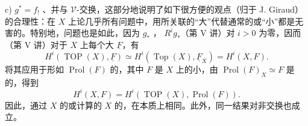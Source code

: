  c)  $g^*=f_!$ 、并与 $\mathcal V$-交换，这部分地说明了如下很方便的观点（归于 J. Giraud）的合理性：在 $X$ 上论几乎所有问题中，用所关联的“大”代替通常的或“小”都是无害的。特别地，问题也是如此，因为 $g_*$ ， $R^ig_*$（第 V 讲）对 $i>0$ 为零，因而（第 V 讲）对于 $X$ 上每个大 $\underline F$，有
\[
 H^i(\operatorname{TOP}(X),\underline F)\simeq H^i(\operatorname{Top}(X),\underline F_X)=H^i(X,F).
\]
将其应用于形如 $\operatorname{Prol}(F)$ 的，其中 $F$ 是 $X$ 上的小，由 $\operatorname{Prol}(F)_X\simeq F$ 是的，得到
\[
 H^i(X,F)=H^i(\operatorname{TOP}(X),\operatorname{Prol}(F)).
\]
因此，通过 $X$ 的或计算的 $X$ 的，在本质上相同。此外，同一结果对非交换也成立。


